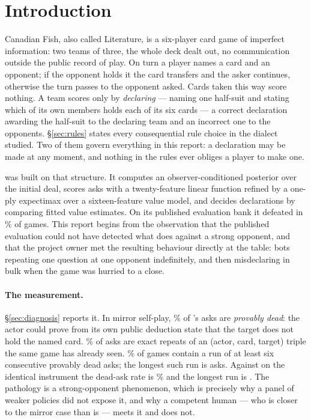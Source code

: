 \section{Introduction}
\label{sec:intro}

Canadian Fish, also called Literature, is a six-player card game of imperfect
information: two teams of three, the whole deck dealt out, no communication
outside the public record of play. On turn a player names a card and an opponent;
if the opponent holds it the card transfers and the asker continues, otherwise
the turn passes to the opponent asked. Cards taken this way score nothing. A team
scores only by \emph{declaring} --- naming one half-suit and stating which of its
own members holds each of its six cards --- a correct declaration awarding the
half-suit to the declaring team and an incorrect one to the opponents.
\S\ref{sec:rules} states every consequential rule choice in the dialect studied.
Two of them govern everything in this report: a declaration may be made at any
moment, and nothing in the rules ever obliges a player to make one.

\vfour{} \cite{fishbot04} was built on that structure. It computes an
observer-conditioned posterior over the initial deal, scores asks with a
twenty-feature linear function refined by a one-ply expectimax over a
sixteen-feature value model, and decides declarations by comparing fitted value
estimates. On its published evaluation bank it defeated \vthree{} \cite{fishbot03} in
\numVfourVsVthree\% of games. This report begins from the observation that the
published evaluation could not have detected what \vfour{} does against a strong
opponent, and that the project owner met the resulting behaviour directly at the
table: bots repeating one question at one opponent indefinitely, and then
misdeclaring in bulk when the game was hurried to a close.

\paragraph{The measurement.} \S\ref{sec:diagnosis} reports it. In mirror
self-play, \numDeadAsk\% of \vfour{}'s asks are \emph{provably dead}: the actor
could prove from its own public deduction state that the target does not hold
the named card. \numRepeatAsk\% of asks are exact repeats of an
(actor, card, target) triple the same game has already seen.
\numDeadRunGames\% of games contain a run of at least six consecutive provably
dead asks; the longest such run is \numDeadRunLongest{} asks. Against \vthree{}
on the identical instrument the dead-ask rate is \numVthreeDeadAsk\% and the
longest run is \numVthreeDeadRun{}. The pathology is a strong-opponent
phenomenon, which is precisely why a panel of weaker policies did not expose it,
and why a competent human --- who is closer to the mirror case than \vthree{} is
--- meets it and \vthree{} does not.

